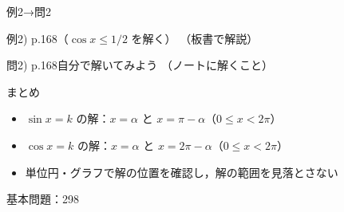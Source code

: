 \documentclass[aspectratio=43,professionalfonts,handout]{beamer}
\begin{document}
\begin{frame}{例2→問2}
  \begin{exampleblock}{例2) p.168（$\cos x \leq 1/2$ を解く）}
    （板書で解説）
  \end{exampleblock}

  \vfill

  \begin{block}{問2) p.168\quad 自分で解いてみよう}
    （ノートに解くこと）
  \end{block}
\end{frame}

\begin{frame}{まとめ}
  \begin{itemize}
    \item $\sin x = k$ の解：$x = \alpha$ と $x = \pi - \alpha$（$0 \leq x < 2\pi$）
    \item $\cos x = k$ の解：$x = \alpha$ と $x = 2\pi - \alpha$（$0 \leq x < 2\pi$）
    \item 単位円・グラフで解の位置を確認し，解の範囲を見落とさない
  \end{itemize}

  \vfill
  {\small 基本問題：298}
\end{frame}
\end{document}
